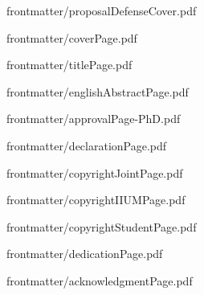 \documentclass[12pt, a4paper, oneside]{memoir}
\begin{document}
\frontmatter

\pagestyle{plain}


{frontmatter/proposalDefenseCover.pdf}


{frontmatter/coverPage.pdf}


{frontmatter/titlePage.pdf}


{frontmatter/englishAbstractPage.pdf}



{frontmatter/approvalPage-PhD.pdf}


{frontmatter/declarationPage.pdf}


{frontmatter/copyrightJointPage.pdf}


{frontmatter/copyrightIIUMPage.pdf}


{frontmatter/copyrightStudentPage.pdf}


{frontmatter/dedicationPage.pdf}


{frontmatter/acknowledgmentPage.pdf}

\tableofcontents*
\newpage
\listoftables
\newpage
\listoffigures

\mainmatter
\DoubleSpacing


\backmatter
\printbibliography[title={REFERENCES}]
\end{document}
